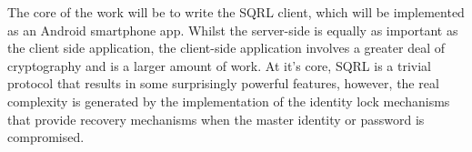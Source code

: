The core of the work will be to write the SQRL client, which will be implemented as an Android smartphone app. Whilst the server-side is equally as important as the client side application, the client-side application involves a greater deal of cryptography and is a larger amount of work. At it's core, SQRL is a trivial protocol that results in some surprisingly powerful features, however, the real complexity is generated by the implementation of the identity lock mechanisms that provide recovery mechanisms when the master identity or password is compromised.
